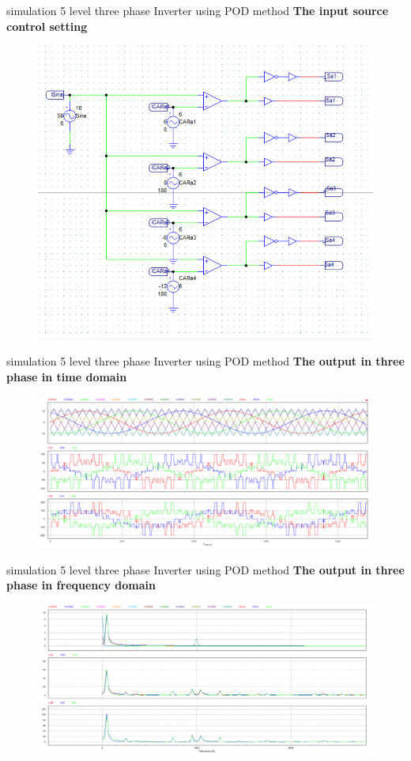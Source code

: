 \documentclass[
	11pt, %
]{beamer}
\begin{document}
\begin{frame}{simulation 5 level three phase Inverter using POD method}
	\scriptsize{\textbf{The input source control setting}}
	\begin{figure}
        \includegraphics[width=0.7\linewidth]{Sim_POD_source.png}
    \end{figure}
\end{frame}

\begin{frame}{simulation 5 level three phase Inverter using POD method}
	\scriptsize{\textbf{The output in three phase in time domain}}
	\begin{figure}
        \includegraphics[width=1\linewidth]{Sim_POD_out3p.png}
    \end{figure}
\end{frame}

\begin{frame}{simulation 5 level three phase Inverter using POD method}
	\scriptsize{\textbf{The output in three phase in frequency domain}}
	\begin{figure}
        \includegraphics[width=1\linewidth]{Sim_POD_FFT.png}
    \end{figure}
\end{frame}
\end{document}
